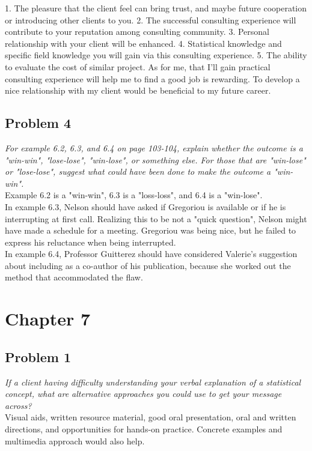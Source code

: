 \documentclass[a4paper,11pt]{article}
\begin{document}
1. The pleasure that the client feel can bring trust, and maybe future cooperation or introducing other clients to you. 2. The successful consulting experience will contribute to your reputation among consulting community. 3. Personal relationship with your client will be enhanced. 4. Statistical knowledge and specific field knowledge you will gain via this consulting experience. 5. The ability to evaluate the cost of similar project. As for me, that I'll gain practical consulting experience will help me to find a good job is rewarding. To develop a nice relationship with my client would be beneficial to my future career.
\subsection*{Problem 4}
\emph{\indent For example 6.2, 6.3, and 6.4 on page 103-104, explain whether the outcome is a "win-win", "lose-lose", "win-lose", or something else. For those that are "win-lose" or "lose-lose", suggest what could have been done to make the outcome a "win-win".}
\\

Example 6.2 is a "win-win", 6.3 is a "loss-loss", and 6.4 is a "win-lose". \\
In example 6.3, Nelson should have asked if Gregoriou is available or if he is interrupting at first call. Realizing this to be not a "quick question", Nelson might have made a schedule for a meeting. Gregoriou was being nice, but he failed to express his reluctance when being interrupted.
\\
\noindent In example 6.4, Professor Guitterez should have considered Valerie's suggestion about including as a co-author of his publication, because she worked out the method that accommodated the flaw.
\section*{Chapter 7}
\subsection*{Problem 1}
\emph{\indent  If a client having difficulty understanding your verbal explanation of a statistical concept, what are alternative approaches you could use to get your message across?}
\\

Visual aids, written resource material, good oral presentation, oral and written directions, and opportunities for hands-on practice. Concrete examples and multimedia approach would also help.
\end{document}

